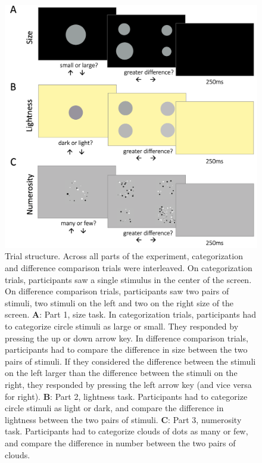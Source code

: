 \documentclass[a4paper, nobind]{templates/ociamthesis}
\begin{document}
\begin{figure}

{\centering \includegraphics[width=1\linewidth]{figures/cat-trial-b} 

}

\caption[Experiment 2, Trial structure]{Trial structure. Across all parts of the experiment, categorization and difference comparison trials were interleaved. On categorization trials, participants saw a single stimulus in the center of the screen. On difference comparison trials, participants saw two pairs of stimuli, two stimuli on the left and two on the right size of the screen. $\textbf{A:}$ Part 1, size task. In categorization trials, participants had to categorize circle stimuli as large or small. They responded by pressing the up or down arrow key. In difference comparison trials, participants had to compare the difference in size between the two pairs of stimuli. If they considered the difference between the stimuli on the left larger than the difference between the stimuli on the right, they responded by pressing the left arrow key (and vice versa for right). $\textbf{B:}$ Part 2, lightness task. Participants had to categorize circle stimuli as light or dark, and compare the difference in lightness between the two pairs of stimuli. $\textbf{C:}$ Part 3, numerosity task. Participants had to categorize clouds of dots as many or few, and compare the difference in number between the two pairs of clouds.}\label{fig:cat-trial-b}
\end{figure}
\end{document}
